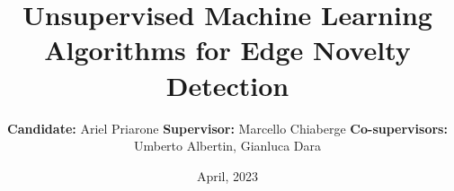 \documentclass[a4paper, 10pt, conference]{ieeeconf}      %
\title{\LARGE \bf
Unsupervised Machine Learning Algorithms for Edge Novelty Detection
}
\date{April, 2023}
\author{\textbf{Candidate:} Ariel Priarone 
\textbf{Supervisor:} Marcello Chiaberge 
\textbf{Co-supervisors:} Umberto Albertin, Gianluca Dara%
}
\begin{document}
\maketitle
\thispagestyle{empty}
\pagestyle{empty}

\begin{abstract}

\end{abstract}






\end{document}
